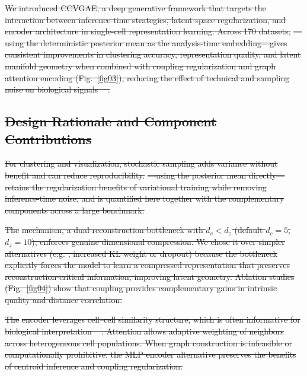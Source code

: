 \documentclass[referee, pdflatex, sn-vancouver-num]{sn-jnl}
\providecommand{\DIFdeltex}[1]{{\protect\color{red}\sout{#1}}}                      %
\providecommand{\DIFdel}[1]{\texorpdfstring{\DIFdeltex{#1}}{}} %
\begin{document}


\DIFdel{We introduced CCVGAE, a deep generative framework that targets the interaction between inference-time strategies, latent-space regularization, and encoder architecture in single-cell representation learning. Across 170 datasets, }%
\DIFdel{---using the deterministic posterior mean as the analysis-time embedding---gives consistent improvements in clustering accuracy, representation quality, and latent manifold geometry when combined with coupling regularization and graph attention encoding (Fig.~\ref{fig03}), reducing the effect of technical and sampling noise on biological signals \mbox{%
\cite{zhang2020dissecting}}\hskip0pt%
.
}%

\subsection*{\DIFdel{Design Rationale and Component Contributions}}

\DIFdel{For clustering and visualization, stochastic sampling adds variance without benefit and can reduce reproducibility. }%
\DIFdel{---using the posterior mean directly---retains the regularization benefits of variational training while removing inference-time noise, and is quantified here together with the complementary components across a large benchmark. }%

\DIFdel{The }%
\DIFdel{mechanism, a dual-reconstruction bottleneck with $d_c < d_z$ (default $d_c = 5$, $d_z = 10$), enforces genuine dimensional compression. We chose it over simpler alternatives (e.g.
, increased KL weight or dropout) because the bottleneck explicitly forces the model to learn a compressed representation that preserves reconstruction-critical information, improving latent geometry. Ablation studies (Fig.~\ref{fig04}) show that coupling provides complementary gains in intrinsic quality and distance correlation. }%

\DIFdel{The }%
\DIFdel{encoder leverages cell--cell similarity structure, which is often informative for biological interpretation \mbox{%
\cite{long2023graph}}\hskip0pt%
. Attention allows adaptive weighting of neighbors across heterogeneous cell populations. When graph construction is infeasible or computationally prohibitive, the MLP encoder alternative preserves the benefits of centroid inference and coupling regularization.
}%
\end{document}
